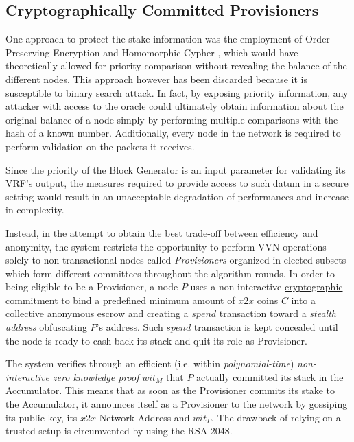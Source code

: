 \subsection{Cryptographically Committed Provisioners}
\label{sec:Cryptographically-Committed-Provisioners}
One approach to protect the stake information was the employment of Order Preserving Encryption and Homomorphic Cypher \cite{alec}, which would have theoretically allowed for priority comparison without revealing the balance of the different nodes. This approach however has been discarded because it is susceptible to binary search attack. In fact, by exposing priority information, any attacker with access to the oracle could ultimately obtain information about the original balance of a node simply by performing multiple comparisons with the hash of a known number. Additionally, every node in the network is required to perform validation on the packets it receives.

Since the priority of the Block Generator is an input parameter for validating its VRF’s output, the measures required to provide access to such datum in a secure setting would result in an unacceptable degradation of performances and increase in complexity.

Instead, in the attempt to obtain the best trade-off between efficiency and anonymity, the system restricts the opportunity to perform VVN operations solely to non-transactional nodes called \textit{Provisioners} organized in elected subsets which form different committees throughout the algorithm rounds. In order to being eligible to be a Provisioner, a node $P$ uses a non-interactive \hyperref[sec:Cryptographic-Accumulator]{cryptographic commitment} to bind a predefined minimum amount of $x2x$ coins $C$ into a collective anonymous escrow and creating a $spend$ transaction toward a \textit{stealth address} obfuscating $P$'s address. Such $spend$ transaction is kept concealed until the node is ready to cash back its stack and quit its role as Provisioner.

The system verifies through an efficient (i.e. within \textit{polynomial-time}) \textit{non-interactive zero knowledge proof}  $wit_M$ that $P$ actually committed its stack in the Accumulator. This means that as soon as the Provisioner commits its stake to the Accumulator, it announces itself as a Provisioner to the network by gossiping its public key, its $x2x$ Network Address and $wit_P$. The drawback of relying on a trusted setup is circumvented by using the RSA-2048.

